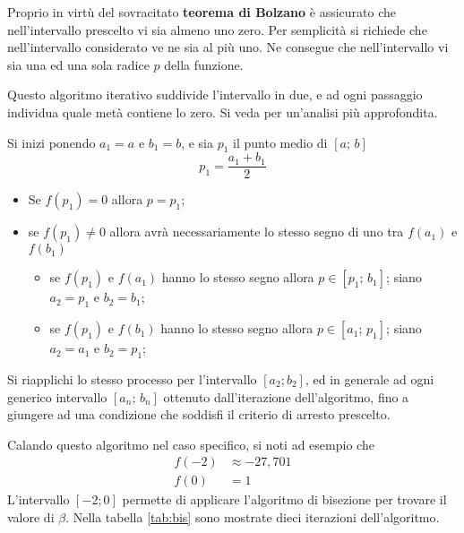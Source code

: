 \documentclass[a4paper, oneside, titlepage, reqno]{book}
\begin{document}
Proprio in virtù del sovracitato \textbf{teorema di Bolzano} \parencite[vol. 5, p. ]{blu:1} %
è assicurato che nell'intervallo prescelto vi sia almeno uno zero. Per semplicità si richiede che nell'intervallo considerato ve ne sia al più uno. Ne consegue che nell'intervallo vi sia una ed una sola radice $p$ della funzione.

Questo algoritmo iterativo suddivide l'intervallo in due, e ad ogni passaggio individua quale metà contiene lo zero. Si veda \parencite[48-53]{num:an} per un'analisi più approfondita.

Si inizi ponendo $a_1=a$ e $b_1=b$, e sia $p_1$ il punto medio di $[a;\,b]$
\[
p_1=\frac{a_1+b_1}{2}
\]
\begin{itemize}
\item Se $f(p_1)=0$ allora $p=p_1$;
\item se $f(p_1)\neq0$ allora avrà necessariamente lo stesso segno di uno tra $f(a_1)$ e $f(b_1)$
\begin{itemize}
\item  se $f(p_1)$ e $f(a_1)$ hanno lo stesso segno allora $p\in [p_1;\,b_1]$; siano $a_2=p_1$ e $b_2=b_1$;
\item  se $f(p_1)$ e $f(b_1)$ hanno lo stesso segno allora $p\in [a_1;\,p_1]$; siano $a_2=a_1$ e $b_2=p_1$;
\end{itemize}
\end{itemize}
Si riapplichi lo stesso processo per l'intervallo $[a_2; b_2]$, ed in generale ad ogni generico intervallo $[a_n;\,b_n]$ ottenuto dall'iterazione dell'algoritmo, fino a giungere ad una condizione che soddisfi il criterio di arresto prescelto. %

Calando questo algoritmo nel caso specifico, si noti ad esempio che 
\begin{align*}
f(-2)&\approx-27,701\\
f(0)&=1
\end{align*}
L'intervallo $[-2; 0]$ permette di applicare l'algoritmo di bisezione per trovare il valore di $\beta$. Nella tabella \ref{tab:bis} sono mostrate dieci iterazioni dell'algoritmo.
\end{document}
